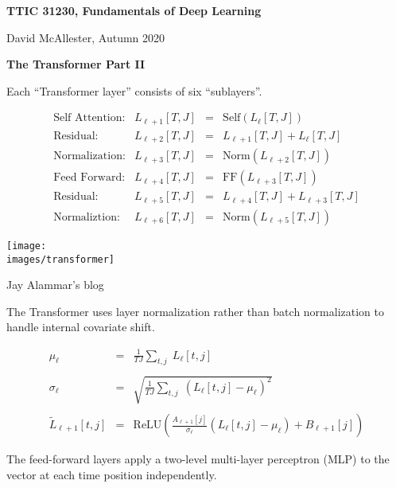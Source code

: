 





{\Huge
  \centerline{\bf TTIC 31230,  Fundamentals of Deep Learning}
  \vfill
  \centerline{David McAllester, Autumn 2020}
  \vfill
  \centerline{\bf  The Transformer Part II}
  \vfill
  \vfill


Each ``Transformer layer'' consists of six ``sublayers''.

$$\begin{array}{rrcl}
\mbox{Self Attention:} &L_{\ell+1}[T,J] & = & \mathrm{Self}(L_\ell[T,J]) \\
\mbox{Residual:} & L_{\ell+2}[T,J] & = & L_{\ell+1}[T,J] + L_\ell[T,J] \\
\mbox{Normalization:} & L_{\ell+3}[T,J] & = & \mathrm{Norm}(L_{\ell+2}[T,J]) \\
\mbox{Feed Forward:} & L_{\ell+4}[T,J] & = &\mathrm{FF}(L_{\ell+3}[T,J]) \\
\mbox{Residual:} & L_{\ell+5}[T,J] & = & L_{\ell+4}[T,J] + L_{\ell+3}[T,J] \\
\mbox{Normaliztion:} & L_{\ell+6}[T,J] & = & \mathrm{Norm}(L_{\ell+5}[T,J])
\end{array}$$


\centerline{\texttt{[image: \\images/transformer]}}

{\Large
\centerline{Jay Alammar's blog}
}


The Transformer uses layer normalization rather than batch normalization to handle internal covariate shift.

\vfill
\begin{eqnarray*}
  \mu_\ell & = & \frac{1}{TJ} \sum_{t,j} \;L_\ell[t,j] \\
  \\
  \sigma_{\ell} & = & \sqrt{\frac{1}{TJ} \sum_{t,j}\;(L_\ell[t,j] - \mu_\ell)^2} \\
  \\
  \tilde{L}_{\ell+1}[t,j] & = & \mathrm{ReLU}\left(\frac{A_{\ell+1}[j]}{\sigma_\ell}(L_\ell[t,j] -\mu_\ell) + B_{\ell+1}[j]\right)
\end{eqnarray*}


The feed-forward layers apply a two-level multi-layer perceptron (MLP) to the vector at each time position independently.

}
